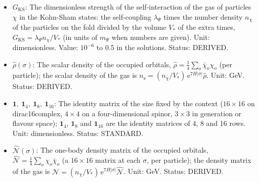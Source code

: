 \documentclass[
  10pt,
]{article}
\begin{document}
\begin{itemize}
  Kohn-Sham equation of the gas: the \(16 \times 16\) matrix
  \(\lambda_\Psi(n_{\mathrm{s}}\mathbf{1} - \mathcal{N})\) at each
  \(\sigma\), which adds to the mass \(m_\Psi\); positive (repulsive)
  for \(\lambda_\Psi > 0\). Unit: GeV. Status: DERIVED.
\item
  \(G_{\mathrm{KS}}\): The dimensionless strength of the
  self-interaction of the gas of particles \(\chi\) in the Kohn-Sham
  states: the self-coupling \(\lambda_\Psi\) times the number density
  \(n_\chi\) of the particles on the fold divided by the volume \(V_*\)
  of the extra times, \(G_{\mathrm{KS}} = \lambda_\Psi n_\chi/V_*\) (in
  units of \(m_\Psi\) when numbers are given). Unit: dimensionless.
  Value: \(10^{-6}\) to 0.5 in the solutions. Status: DERIVED.
\item
  \(\hat\rho(\sigma)\): The scalar density of the occupied orbitals,
  \(\hat\rho = \frac14\sum_o\bar\chi_o\chi_o\) (per particle); the
  scalar density of the gas is
  \(n_{\mathrm{s}} = (n_\chi/V_*)\,\mathrm{e}^{7H\lvert\sigma\rvert}\hat\rho\).
  Unit: GeV. Status: DERIVED.
\item
  \(\mathbf{1},\ \mathbf{1}_4,\ \mathbf{1}_8,\ \mathbf{1}_{16}\): The
  identity matrix of the size fixed by the context (\(16 \times 16\) on
  dirac16complex, \(4 \times 4\) on a four-dimensional spinor,
  \(3 \times 3\) in generation or flavour space); \(\mathbf{1}_4\),
  \(\mathbf{1}_8\) and \(\mathbf{1}_{16}\) are the identity matrices of
  4, 8 and 16 rows. Unit: dimensionless. Status: STANDARD.
\item
  \(\hat{\mathcal{N}}(\sigma)\): The one-body density matrix of the
  occupied orbitals,
  \(\hat{\mathcal{N}} = \frac14\sum_o\chi_o\bar\chi_o\) (a
  \(16 \times 16\) matrix at each \(\sigma\), per particle); the density
  matrix of the gas is
  \(\mathcal{N} = (n_\chi/V_*)\,\mathrm{e}^{7H\lvert\sigma\rvert}\hat{\mathcal{N}}\).
  Unit: GeV. Status: DERIVED.
\end{itemize}
\end{document}
